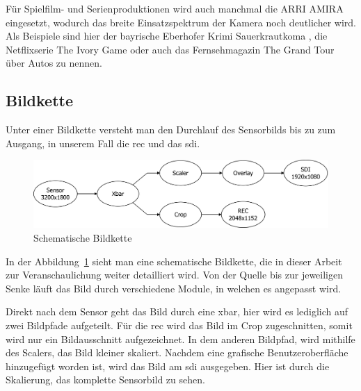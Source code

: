 Für Spielfilm- und Serienproduktionen wird auch manchmal die ARRI AMIRA eingesetzt, wodurch das breite Einsatzspektrum der Kamera noch deutlicher wird.
Als Beispiele sind hier der bayrische Eberhofer Krimi \glqq Sauerkrautkoma\grqq{} \cite{arrikrimi}, die Netflixserie \glqq The Ivory Game\grqq{} \cite{imdbivory} oder auch das Fernsehmagazin \glqq The Grand Tour\grqq{} über Autos \cite{imdbtour} zu nennen.



\subsection{Bildkette}
Unter einer Bildkette versteht man den Durchlauf des Sensorbilds bis zu zum Ausgang, in unserem Fall die \ac{rec} und das \ac{sdi}.

\begin{figure}[!hbtp]
	\centering
	\includegraphics[width = \linewidth]{pictures/bildkette.png}
	\smallskip
	\caption{Schematische Bildkette}
	\label{fig:bild}
\end{figure} 

In der Abbildung~\ref{fig:bild} sieht man eine schematische Bildkette, die in dieser Arbeit zur Veranschaulichung weiter detailliert wird. 
Von der Quelle bis zur jeweiligen Senke läuft das Bild durch verschiedene Module, in welchen es angepasst wird. 

Direkt nach dem Sensor geht das Bild durch eine \acl{xbar}, hier wird es lediglich auf zwei Bildpfade aufgeteilt. Für die \acl{rec} wird das Bild im Crop zugeschnitten, somit wird nur ein Bildausschnitt aufgezeichnet. In dem anderen Bildpfad, wird mithilfe des Scalers, das Bild kleiner skaliert. Nachdem eine grafische Benutzeroberfläche hinzugefügt worden ist, wird das Bild am \ac{sdi} ausgegeben. Hier ist durch die Skalierung, das komplette Sensorbild zu sehen.



